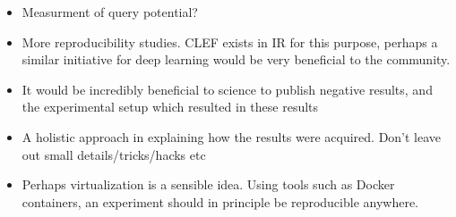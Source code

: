 \begin{itemize}

	\item Measurment of query potential?
	\item More reproducibility studies. CLEF exists in IR for this purpose, perhaps a similar initiative for deep learning would be very beneficial to the community.
    \item It would be incredibly beneficial to science to publish negative results, and the experimental setup which resulted in these results
    \item A holistic approach in explaining how the results were acquired. Don't leave out small details/tricks/hacks etc
    \item Perhaps virtualization is a sensible idea. Using tools such as Docker containers, an experiment should in principle be reproducible anywhere.
\end{itemize}